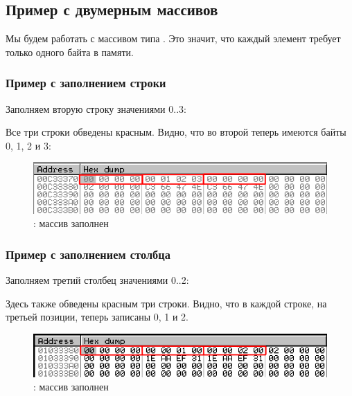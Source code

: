 \subsection{Пример с двумерным массивов}

Мы будем работать с массивом типа \Tchar. Это значит, что каждый элемент требует
только одного байта в памяти.

\subsubsection{Пример с заполнением строки}
\myindex{\olly}

Заполняем вторую строку значениями 0..3:



Все три строки обведены красным. 
Видно, что во второй теперь имеются байты 0, 1, 2 и 3:

\begin{figure}[H]
\centering
\includegraphics[scale=\NormalScale]{patterns/13_arrays/5_multidimensional/olly_2D_1.png}
\caption{\olly: массив заполнен}
\end{figure}

\subsubsection{Пример с заполнением столбца}
\myindex{\olly}

Заполняем третий столбец значениями 0..2:



Здесь также обведены красным три строки. 
Видно, что в каждой строке, на третьей позиции, теперь записаны 0, 1 и 2.

\begin{figure}[H]
\centering
\includegraphics[scale=\NormalScale]{patterns/13_arrays/5_multidimensional/olly_2D_2.png}
\caption{\olly: массив заполнен}
\end{figure}
